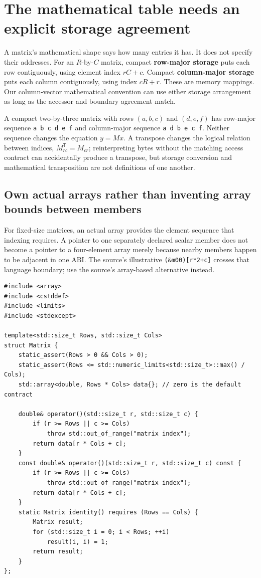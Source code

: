 \section{The mathematical table needs an explicit storage agreement}\label{02-foundations-ii-ch038-the-mathematical-table-needs-an-explicit-storage-agreement}

A matrix's mathematical shape says how many entries it has. It does not specify their addresses. For an \(R\)-by-\(C\) matrix, compact \textbf{row-major storage} puts each row contiguously, using element index \(rC+c\). Compact \textbf{column-major storage} puts each column contiguously, using index \(cR+r\). These are memory mappings. Our column-vector mathematical convention can use either storage arrangement as long as the accessor and boundary agreement match.

A compact two-by-three matrix with rows \((a,b,c)\) and \((d,e,f)\) has row-major sequence \texttt{a\ b\ c\ d\ e\ f} and column-major sequence \texttt{a\ d\ b\ e\ c\ f}. Neither sequence changes the equation \(y=Mx\). A transpose changes the logical relation between indices, \(M^{\mathsf T}_{rc}=M_{cr}\); reinterpreting bytes without the matching access contract can accidentally produce a transpose, but storage conversion and mathematical transposition are not definitions of one another.

\subsection{Own actual arrays rather than inventing array bounds between members}\label{02-foundations-ii-ch038-own-actual-arrays-rather-than-inventing-array-bounds-between-members}

For fixed-size matrices, an actual array provides the element sequence that indexing requires. A pointer to one separately declared scalar member does not become a pointer to a four-element array merely because nearby members happen to be adjacent in one ABI. The source's illustrative \texttt{(\&m00){[}r*2+c{]}} crosses that language boundary; use the source's array-based alternative instead.

\begin{verbatim}
#include <array>
#include <cstddef>
#include <limits>
#include <stdexcept>

template<std::size_t Rows, std::size_t Cols>
struct Matrix {
    static_assert(Rows > 0 && Cols > 0);
    static_assert(Rows <= std::numeric_limits<std::size_t>::max() / Cols);
    std::array<double, Rows * Cols> data{}; // zero is the default contract

    double& operator()(std::size_t r, std::size_t c) {
        if (r >= Rows || c >= Cols)
            throw std::out_of_range("matrix index");
        return data[r * Cols + c];
    }
    const double& operator()(std::size_t r, std::size_t c) const {
        if (r >= Rows || c >= Cols)
            throw std::out_of_range("matrix index");
        return data[r * Cols + c];
    }
    static Matrix identity() requires (Rows == Cols) {
        Matrix result;
        for (std::size_t i = 0; i < Rows; ++i)
            result(i, i) = 1;
        return result;
    }
};
\end{verbatim}

